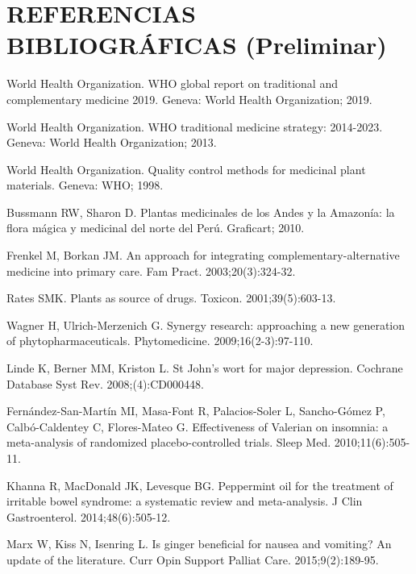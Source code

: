 \documentclass[12pt,a4paper]{article}
\begin{document}
\newpage
\section*{REFERENCIAS BIBLIOGRÁFICAS (Preliminar)}

\begin{thebibliography}{99}

World Health Organization. WHO global report on traditional and complementary medicine 2019. Geneva: World Health Organization; 2019.

World Health Organization. WHO traditional medicine strategy: 2014-2023. Geneva: World Health Organization; 2013.

World Health Organization. Quality control methods for medicinal plant materials. Geneva: WHO; 1998.

Bussmann RW, Sharon D. Plantas medicinales de los Andes y la Amazonía: la flora mágica y medicinal del norte del Perú. Graficart; 2010.

Frenkel M, Borkan JM. An approach for integrating complementary-alternative medicine into primary care. Fam Pract. 2003;20(3):324-32.

Rates SMK. Plants as source of drugs. Toxicon. 2001;39(5):603-13.

Wagner H, Ulrich-Merzenich G. Synergy research: approaching a new generation of phytopharmaceuticals. Phytomedicine. 2009;16(2-3):97-110.

Linde K, Berner MM, Kriston L. St John's wort for major depression. Cochrane Database Syst Rev. 2008;(4):CD000448.

Fernández-San-Martín MI, Masa-Font R, Palacios-Soler L, Sancho-Gómez P, Calbó-Caldentey C, Flores-Mateo G. Effectiveness of Valerian on insomnia: a meta-analysis of randomized placebo-controlled trials. Sleep Med. 2010;11(6):505-11.

Khanna R, MacDonald JK, Levesque BG. Peppermint oil for the treatment of irritable bowel syndrome: a systematic review and meta-analysis. J Clin Gastroenterol. 2014;48(6):505-12.

Marx W, Kiss N, Isenring L. Is ginger beneficial for nausea and vomiting? An update of the literature. Curr Opin Support Palliat Care. 2015;9(2):189-95.


\end{thebibliography}
\end{document}
